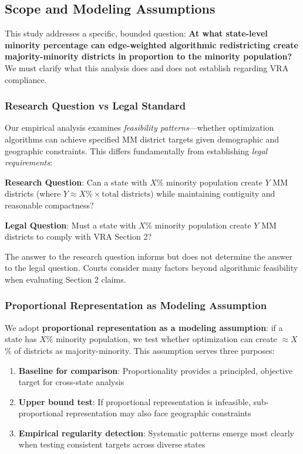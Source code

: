 \subsection{Scope and Modeling Assumptions}

This study addresses a specific, bounded question: \textbf{At what state-level minority percentage can edge-weighted algorithmic redistricting create majority-minority districts in proportion to the minority population?} We must clarify what this analysis does and does not establish regarding VRA compliance.

\subsubsection{Research Question vs Legal Standard}

Our empirical analysis examines \emph{feasibility patterns}---whether optimization algorithms can achieve specified MM district targets given demographic and geographic constraints. This differs fundamentally from establishing \emph{legal requirements}:

\textbf{Research Question}: Can a state with $X$\% minority population create $Y$ MM districts (where $Y \approx X\% \times \text{total districts}$) while maintaining contiguity and reasonable compactness?

\textbf{Legal Question}: Must a state with $X$\% minority population create $Y$ MM districts to comply with VRA Section 2?

The answer to the research question informs but does not determine the answer to the legal question. Courts consider many factors beyond algorithmic feasibility when evaluating Section 2 claims.

\subsubsection{Proportional Representation as Modeling Assumption}

We adopt \textbf{proportional representation as a modeling assumption}: if a state has $X$\% minority population, we test whether optimization can create $\approx X$\% of districts as majority-minority. This assumption serves three purposes:

\begin{enumerate}
    \item \textbf{Baseline for comparison}: Proportionality provides a principled, objective target for cross-state analysis
    \item \textbf{Upper bound test}: If proportional representation is infeasible, sub-proportional representation may also face geographic constraints
    \item \textbf{Empirical regularity detection}: Systematic patterns emerge most clearly when testing consistent targets across diverse states
\end{enumerate}

